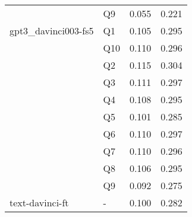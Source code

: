 \begin{tabular}{llrr}
                & Q9 & 0.055 & 0.221 \\
gpt3\_davinci003-fs5 & Q1 & 0.105 & 0.295 \\
                & Q10 & 0.110 & 0.296 \\
                & Q2 & 0.115 & 0.304 \\
                & Q3 & 0.111 & 0.297 \\
                & Q4 & 0.108 & 0.295 \\
                & Q5 & 0.101 & 0.285 \\
                & Q6 & 0.110 & 0.297 \\
                & Q7 & 0.110 & 0.296 \\
                & Q8 & 0.106 & 0.295 \\
                & Q9 & 0.092 & 0.275 \\
text-davinci-ft & - & 0.100 & 0.282 \\
\bottomrule
\end{tabular}
